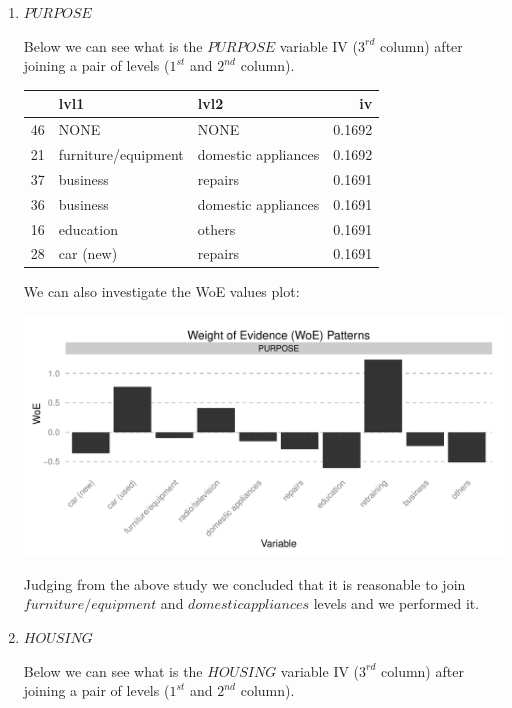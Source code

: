 \documentclass[10pt]{article}\usepackage[]{graphicx}\usepackage[]{color}
\newenvironment{knitrout}{}{} %
\begin{document}
\begin{enumerate}
\item $PURPOSE$



Below we can see what is the $PURPOSE$ variable IV ($3^{rd}$ column) after joining a pair of levels ($1^{st}$ and $2^{nd}$ column). 

\begin{knitrout}
\color{fgcolor}
\begin{tabular}{l|l|l|r}
\hline
  & lvl1 & lvl2 & iv\\
\hline
46 & NONE & NONE & 0.1692\\
\hline
21 & furniture/equipment & domestic appliances & 0.1692\\
\hline
37 & business & repairs & 0.1691\\
\hline
36 & business & domestic appliances & 0.1691\\
\hline
16 & education & others & 0.1691\\
\hline
28 & car (new) & repairs & 0.1691\\
\hline
\end{tabular}


\end{knitrout}

We can also investigate the WoE values plot: 

\begin{knitrout}
\color{fgcolor}
\includegraphics[width=.65\linewidth]{figure/unnamed-chunk-12-1} 

\end{knitrout}

Judging from the above study we concluded that it is reasonable to join $furniture/equipment$ and $domestic appliances$ levels and we performed it. 

\item $HOUSING$



Below we can see what is the $HOUSING$ variable IV ($3^{rd}$ column) after joining a pair of levels ($1^{st}$ and $2^{nd}$ column). 


\end{enumerate}
\end{document}
